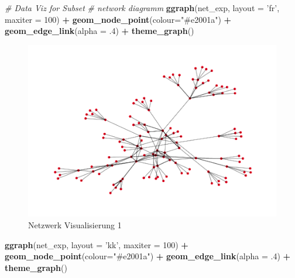 \documentclass[
  12 pt,
]{article}
\newenvironment{Shaded}{\begin{snugshade}}{\end{snugshade}}
\newcommand{\CommentTok}[1]{\textcolor[rgb]{0.56,0.35,0.01}{\textit{#1}}}
\newcommand{\DataTypeTok}[1]{\textcolor[rgb]{0.13,0.29,0.53}{#1}}
\newcommand{\DecValTok}[1]{\textcolor[rgb]{0.00,0.00,0.81}{#1}}
\newcommand{\FloatTok}[1]{\textcolor[rgb]{0.00,0.00,0.81}{#1}}
\newcommand{\KeywordTok}[1]{\textcolor[rgb]{0.13,0.29,0.53}{\textbf{#1}}}
\newcommand{\NormalTok}[1]{#1}
\newcommand{\OperatorTok}[1]{\textcolor[rgb]{0.81,0.36,0.00}{\textbf{#1}}}
\newcommand{\StringTok}[1]{\textcolor[rgb]{0.31,0.60,0.02}{#1}}
\begin{document}
\begin{Shaded}
\begin{Highlighting}[]
\CommentTok{# Data Viz for Subset}
\CommentTok{# network diagramm}
\KeywordTok{ggraph}\NormalTok{(net_exp, }\DataTypeTok{layout =} \StringTok{'fr'}\NormalTok{, }\DataTypeTok{maxiter =} \DecValTok{100}\NormalTok{) }\OperatorTok{+}\StringTok{ }
\StringTok{  }\KeywordTok{geom_node_point}\NormalTok{(}\DataTypeTok{colour=}\StringTok{"#e2001a"}\NormalTok{) }\OperatorTok{+}\StringTok{ }
\StringTok{  }\KeywordTok{geom_edge_link}\NormalTok{(}\DataTypeTok{alpha =} \FloatTok{.4}\NormalTok{) }\OperatorTok{+}
\StringTok{  }\KeywordTok{theme_graph}\NormalTok{()}
\end{Highlighting}
\end{Shaded}

\begin{figure}
\centering
\includegraphics{Assignment_files/figure-latex/unnamed-chunk-2-1.pdf}
\caption{Netzwerk Visualisierung 1}
\end{figure}

\begin{Shaded}
\begin{Highlighting}[]
\KeywordTok{ggraph}\NormalTok{(net_exp, }\DataTypeTok{layout =} \StringTok{'kk'}\NormalTok{, }\DataTypeTok{maxiter =} \DecValTok{100}\NormalTok{) }\OperatorTok{+}\StringTok{ }
\StringTok{  }\KeywordTok{geom_node_point}\NormalTok{(}\DataTypeTok{colour=}\StringTok{"#e2001a"}\NormalTok{) }\OperatorTok{+}\StringTok{ }
\StringTok{  }\KeywordTok{geom_edge_link}\NormalTok{(}\DataTypeTok{alpha =} \FloatTok{.4}\NormalTok{) }\OperatorTok{+}
\StringTok{  }\KeywordTok{theme_graph}\NormalTok{()}
\end{Highlighting}
\end{Shaded}
\end{document}

